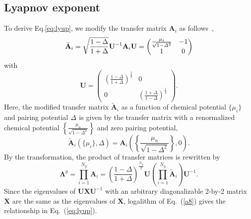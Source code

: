 \documentclass[%
superscriptaddress,
preprint,
amsmath,amssymb,
]{revtex4-1}
\newcommand{\mbf}{\mathbf}
\begin{document}
\subsection{Lyapnov exponent}
To derive Eq.\ref{eq:lyup}, we modify the transfer matrix $\mbf{A}_i$ as follows~\cite{DeGottardi13},
\begin{equation}
\tilde{\mbf{A}}_i = \sqrt{\frac{1-\Delta}{1+\Delta}} \mbf{U}^{-1} \mbf{A}_i \mbf{U} = \left(
\begin{matrix}
\frac{\mu_i}{\sqrt{1-{\it\Delta}^2}} & -1 \\ 1 & 0
\end{matrix}
\right)
\end{equation}
with
\begin{equation}
\mbf{U}=\left(\begin{matrix}
\left(\frac{1-\Delta}{1+\Delta}\right)^{\frac{1}{4}}&0\\0&	\left(\frac{1+\Delta}{1-\Delta}\right)^{\frac{1}{4}}
\end{matrix}\right).
\end{equation}
Here, the modified transfer matrix $\tilde{\mbf{A}}_i$ as a function of chemical potential $\{\mu_i\}$ and pairing potential ${\it\Delta}$ is given by the transfer matrix with a renormalized chemical potential $\left\{\frac{\mu_n}{\sqrt{1-\Delta^2}}\right\}$ and zero pairing potential,
\begin{equation}
\label{a7}
\tilde{\mbf{A}}_i(\{\mu_i\},\Delta)=\mbf{A}_i\left(\left\{\frac{\mu_n}{\sqrt{1-\Delta^2}}\right\},0\right).
\end{equation}
By the transformation, the product of transfer matrices is rewritten by 
\begin{equation}
\label{a8}
\mbf{\Lambda}^g = \prod_{i=1}^{N_g}\mbf{A}_i =\left(\frac{1-\Delta}{1+\Delta}\right)^{\frac{N_g}{2}} \mbf{U}\left(\prod_{i=1}^{N_g}\tilde{\mbf{A}}_i\right)\mbf{U}^{-1}.
\end{equation}
Since the eigenvalues of $\mbf{U}\mbf{X}\mbf{U}^{-1}$ with an arbitrary diagonalizable 2-by-2 matrix $\mbf{X}$ are the same as the eigenvalues of $\mbf{X}$, logalithm of Eq.~(\ref{a8}) gives the relationship in Eq.~(\ref{eq:lyup}).
\end{document}
